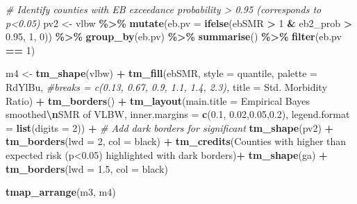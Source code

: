 \documentclass[
]{book}
\newenvironment{Shaded}{\begin{snugshade}}{\end{snugshade}}
\newcommand{\AttributeTok}[1]{\textcolor[rgb]{0.13,0.29,0.53}{#1}}
\newcommand{\CommentTok}[1]{\textcolor[rgb]{0.56,0.35,0.01}{\textit{#1}}}
\newcommand{\DecValTok}[1]{\textcolor[rgb]{0.00,0.00,0.81}{#1}}
\newcommand{\FloatTok}[1]{\textcolor[rgb]{0.00,0.00,0.81}{#1}}
\newcommand{\FunctionTok}[1]{\textcolor[rgb]{0.13,0.29,0.53}{\textbf{#1}}}
\newcommand{\NormalTok}[1]{#1}
\newcommand{\OtherTok}[1]{\textcolor[rgb]{0.56,0.35,0.01}{#1}}
\newcommand{\SpecialCharTok}[1]{\textcolor[rgb]{0.81,0.36,0.00}{\textbf{#1}}}
\newcommand{\StringTok}[1]{\textcolor[rgb]{0.31,0.60,0.02}{#1}}
\begin{document}
\begin{Shaded}
\begin{Highlighting}[]
\CommentTok{\# Identify counties with EB exceedance probability \textgreater{} 0.95 (corresponds to p\textless{}0.05)}
\NormalTok{pv2 }\OtherTok{\textless{}{-}}\NormalTok{ vlbw }\SpecialCharTok{\%\textgreater{}\%}
  \FunctionTok{mutate}\NormalTok{(}\AttributeTok{eb.pv =} \FunctionTok{ifelse}\NormalTok{(ebSMR }\SpecialCharTok{\textgreater{}} \DecValTok{1} \SpecialCharTok{\&}\NormalTok{ eb2\_prob }\SpecialCharTok{\textgreater{}} \FloatTok{0.95}\NormalTok{, }\DecValTok{1}\NormalTok{, }\DecValTok{0}\NormalTok{)) }\SpecialCharTok{\%\textgreater{}\%}
  \FunctionTok{group\_by}\NormalTok{(eb.pv) }\SpecialCharTok{\%\textgreater{}\%}
  \FunctionTok{summarise}\NormalTok{() }\SpecialCharTok{\%\textgreater{}\%}
  \FunctionTok{filter}\NormalTok{(eb.pv }\SpecialCharTok{==} \DecValTok{1}\NormalTok{)}

\NormalTok{m4 }\OtherTok{\textless{}{-}} \FunctionTok{tm\_shape}\NormalTok{(vlbw) }\SpecialCharTok{+}
  \FunctionTok{tm\_fill}\NormalTok{(}\StringTok{\textquotesingle{}ebSMR\textquotesingle{}}\NormalTok{,}
          \AttributeTok{style =} \StringTok{\textquotesingle{}quantile\textquotesingle{}}\NormalTok{,}
          \AttributeTok{palette =} \StringTok{\textquotesingle{}{-}RdYlBu\textquotesingle{}}\NormalTok{,}
          \CommentTok{\#breaks = c(0.13, 0.67, 0.9, 1.1, 1.4, 2.3),}
          \AttributeTok{title =} \StringTok{\textquotesingle{}Std. Morbidity Ratio\textquotesingle{}}\NormalTok{) }\SpecialCharTok{+} 
  \FunctionTok{tm\_borders}\NormalTok{() }\SpecialCharTok{+}
  \FunctionTok{tm\_layout}\NormalTok{(}\AttributeTok{main.title =} \StringTok{\textquotesingle{}Empirical Bayes smoothed}\SpecialCharTok{\textbackslash{}n}\StringTok{SMR of VLBW\textquotesingle{}}\NormalTok{,}
            \AttributeTok{inner.margins =} \FunctionTok{c}\NormalTok{(}\FloatTok{0.1}\NormalTok{, }\FloatTok{0.02}\NormalTok{,}\FloatTok{0.05}\NormalTok{,}\FloatTok{0.2}\NormalTok{),}
            \AttributeTok{legend.format =} \FunctionTok{list}\NormalTok{(}\AttributeTok{digits =} \DecValTok{2}\NormalTok{)) }\SpecialCharTok{+}
  \CommentTok{\# Add dark borders for significant}
  \FunctionTok{tm\_shape}\NormalTok{(pv2) }\SpecialCharTok{+}
  \FunctionTok{tm\_borders}\NormalTok{(}\AttributeTok{lwd =} \DecValTok{2}\NormalTok{, }\AttributeTok{col =} \StringTok{\textquotesingle{}black\textquotesingle{}}\NormalTok{) }\SpecialCharTok{+}
  \FunctionTok{tm\_credits}\NormalTok{(}\StringTok{\textquotesingle{}Counties with higher than expected risk (p\textless{}0.05) highlighted with dark borders\textquotesingle{}}\NormalTok{)}\SpecialCharTok{+}
  \FunctionTok{tm\_shape}\NormalTok{(ga) }\SpecialCharTok{+}
  \FunctionTok{tm\_borders}\NormalTok{(}\AttributeTok{lwd =} \FloatTok{1.5}\NormalTok{, }\AttributeTok{col =} \StringTok{\textquotesingle{}black\textquotesingle{}}\NormalTok{)}

\FunctionTok{tmap\_arrange}\NormalTok{(m3, m4)}
\end{Highlighting}
\end{Shaded}
\end{document}
